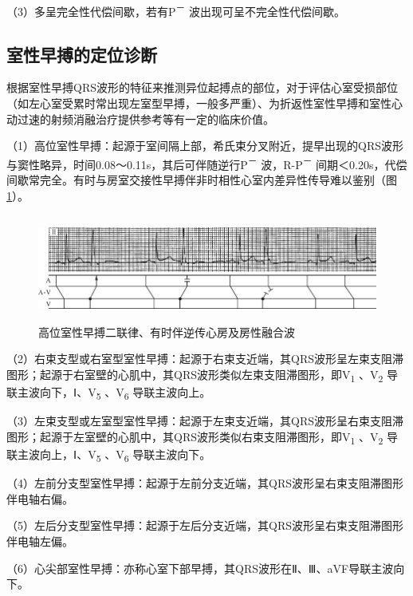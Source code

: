 （3）多呈完全性代偿间歇，若有P\textsuperscript{－}
波出现可呈不完全性代偿间歇。

\protect\hypertarget{text00018.htmlux5cux23subid152}{}{}

\subsection{室性早搏的定位诊断}

根据室性早搏QRS波形的特征来推测异位起搏点的部位，对于评估心室受损部位（如左心室受累时常出现左室型早搏，一般多严重）、为折返性室性早搏和室性心动过速的射频消融治疗提供参考等有一定的临床价值。

（1）高位室性早搏：起源于室间隔上部，希氏束分叉附近，提早出现的QRS波形与窦性略异，时间0.08～0.11s，其后可伴随逆行P\textsuperscript{－}
波，R-P\textsuperscript{－}
间期＜0.20s，代偿间歇常完全。有时与房室交接性早搏伴非时相性心室内差异性传导难以鉴别（图\ref{fig11-19}）。

\begin{figure}[!htbp]
 \centering
 \includegraphics[width=5.75in,height=1.38542in]{./images/Image00179.jpg}
 \captionsetup{justification=centering}
 \caption{高位室性早搏二联律、有时伴逆传心房及房性融合波}
 \label{fig11-19}
  \end{figure} 

（2）右束支型或右室型室性早搏：起源于右束支近端，其QRS波形呈左束支阻滞图形；起源于右室壁的心肌中，其QRS波形类似左束支阻滞图形，即V\textsubscript{1}
、V\textsubscript{2} 导联主波向下，Ⅰ、V\textsubscript{5}
、V\textsubscript{6} 导联主波向上。

（3）左束支型或左室型室性早搏：起源于左束支近端，其QRS波形呈右束支阻滞图形；起源于左室壁的心肌中，其QRS波形类似右束支阻滞图形，即V\textsubscript{1}
、V\textsubscript{2} 导联主波向上，Ⅰ、V\textsubscript{5}
、V\textsubscript{6} 导联主波向下。

（4）左前分支型室性早搏：起源于左前分支近端，其QRS波形呈右束支阻滞图形伴电轴右偏。

（5）左后分支型室性早搏：起源于左后分支近端，其QRS波形呈右束支阻滞图形伴电轴左偏。

（6）心尖部室性早搏：亦称心室下部早搏，其QRS波形在Ⅱ、Ⅲ、aVF导联主波向下。

